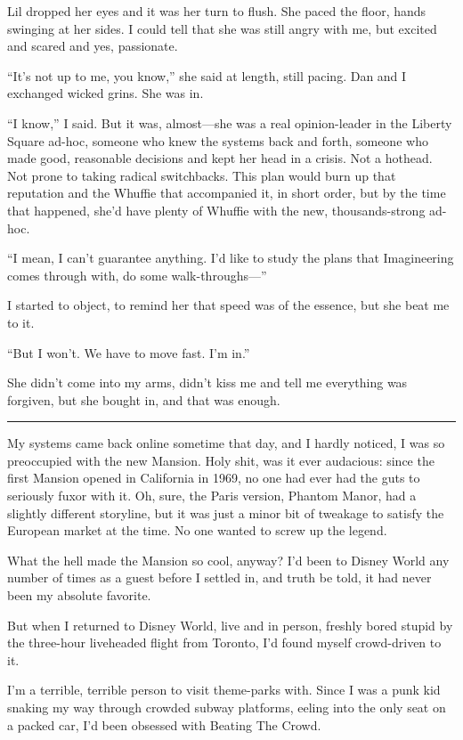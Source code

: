 Lil dropped her eyes and it was her turn to flush. She paced the
floor, hands swinging at her sides. I could tell that she was still
angry with me, but excited and scared and yes, passionate.

“It's not up to me, you know,” she said at length, still pacing.
Dan and I exchanged wicked grins. She was in.

“I know,” I said. But it was, almost—she was a real opinion-leader
in the Liberty Square ad-hoc, someone who knew the systems back and
forth, someone who made good, reasonable decisions and kept her
head in a crisis. Not a hothead. Not prone to taking radical
switchbacks. This plan would burn up that reputation and the
Whuffie that accompanied it, in short order, but by the time that
happened, she'd have plenty of Whuffie with the new,
thousands-strong ad-hoc.

“I mean, I can't guarantee anything. I'd like to study the plans
that Imagineering comes through with, do some walk-throughs—”

I started to object, to remind her that speed was of the essence,
but she beat me to it.

“But I won't. We have to move fast. I'm in.”

She didn't come into my arms, didn't kiss me and tell me everything
was forgiven, but she bought in, and that was enough.

\begin{center}\rule{3in}{0.4pt}\end{center}

My systems came back online sometime that day, and I hardly
noticed, I was so preoccupied with the new Mansion. Holy shit, was
it ever audacious: since the first Mansion opened in California in
1969, no one had ever had the guts to seriously fuxor with it. Oh,
sure, the Paris version, Phantom Manor, had a slightly different
storyline, but it was just a minor bit of tweakage to satisfy the
European market at the time. No one wanted to screw up the legend.

What the hell made the Mansion so cool, anyway? I'd been to Disney
World any number of times as a guest before I settled in, and truth
be told, it had never been my absolute favorite.

But when I returned to Disney World, live and in person, freshly
bored stupid by the three-hour liveheaded flight from Toronto, I'd
found myself crowd-driven to it.

I'm a terrible, terrible person to visit theme-parks with. Since I
was a punk kid snaking my way through crowded subway platforms,
eeling into the only seat on a packed car, I'd been obsessed with
Beating The Crowd.

